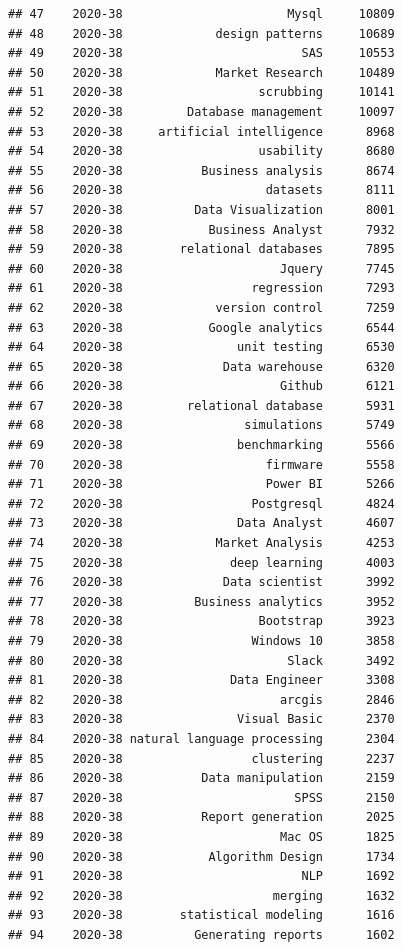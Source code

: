 \documentclass[
]{article}
\begin{document}
\begin{verbatim}
## 47    2020-38                       Mysql     10809
## 48    2020-38             design patterns     10689
## 49    2020-38                         SAS     10553
## 50    2020-38             Market Research     10489
## 51    2020-38                   scrubbing     10141
## 52    2020-38         Database management     10097
## 53    2020-38     artificial intelligence      8968
## 54    2020-38                   usability      8680
## 55    2020-38           Business analysis      8674
## 56    2020-38                    datasets      8111
## 57    2020-38          Data Visualization      8001
## 58    2020-38            Business Analyst      7932
## 59    2020-38        relational databases      7895
## 60    2020-38                      Jquery      7745
## 61    2020-38                  regression      7293
## 62    2020-38             version control      7259
## 63    2020-38            Google analytics      6544
## 64    2020-38                unit testing      6530
## 65    2020-38              Data warehouse      6320
## 66    2020-38                      Github      6121
## 67    2020-38         relational database      5931
## 68    2020-38                 simulations      5749
## 69    2020-38                benchmarking      5566
## 70    2020-38                    firmware      5558
## 71    2020-38                    Power BI      5266
## 72    2020-38                  Postgresql      4824
## 73    2020-38                Data Analyst      4607
## 74    2020-38             Market Analysis      4253
## 75    2020-38               deep learning      4003
## 76    2020-38              Data scientist      3992
## 77    2020-38          Business analytics      3952
## 78    2020-38                   Bootstrap      3923
## 79    2020-38                  Windows 10      3858
## 80    2020-38                       Slack      3492
## 81    2020-38               Data Engineer      3308
## 82    2020-38                      arcgis      2846
## 83    2020-38                Visual Basic      2370
## 84    2020-38 natural language processing      2304
## 85    2020-38                  clustering      2237
## 86    2020-38           Data manipulation      2159
## 87    2020-38                        SPSS      2150
## 88    2020-38           Report generation      2025
## 89    2020-38                      Mac OS      1825
## 90    2020-38            Algorithm Design      1734
## 91    2020-38                         NLP      1692
## 92    2020-38                     merging      1632
## 93    2020-38        statistical modeling      1616
## 94    2020-38          Generating reports      1602

\end{verbatim}
\end{document}
